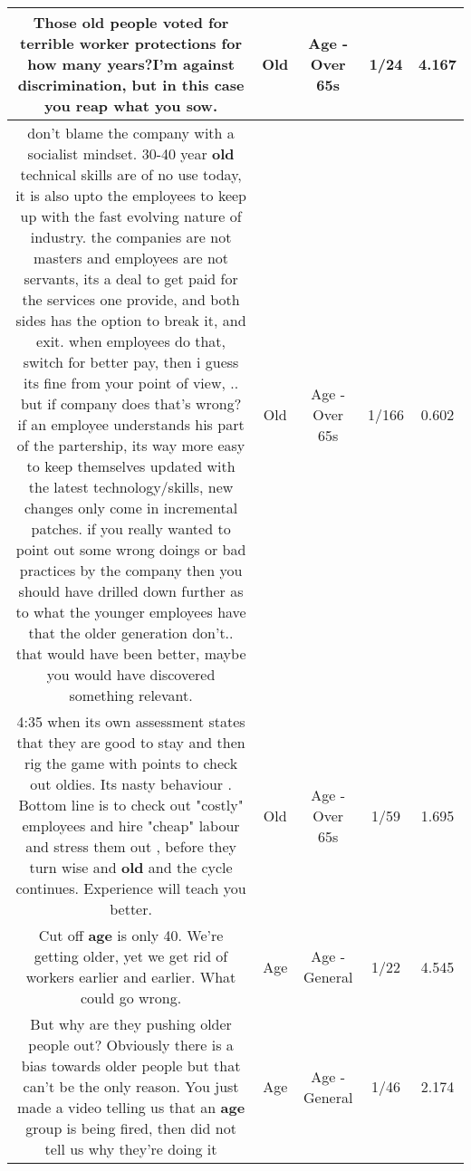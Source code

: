 \documentclass[11pt]{article}
\newlength\mylength
\begin{document}
\begin{center}
\begin{longtable}{|C{.65\mylength}|C{.30\mylength}|C{.12\mylength}|C{.12\mylength}|C{.12\mylength}|}
  \small Those \textbf{old} people voted for terrible worker protections for how many years?I'm against discrimination, but in this case you reap what you sow.\normalsize   & Old & Age - Over 65s & 1/24 & 4.167 \\  \hline
  \small don't blame the company with a socialist mindset. 30-40 year \textbf{old} technical skills are of no use today, it is also upto the employees to keep up with the fast evolving nature of industry. the companies are not masters and employees are not servants, its a deal to get paid for the services  one provide, and both sides has the option to break it, and exit. when employees do that, switch for better pay, then i guess its fine from your point of view, .. but if company does that's wrong? if an employee understands his part of the partership, its way more easy to keep themselves updated with the latest technology/skills, new changes only come in incremental patches. if you really wanted to point out some wrong doings or bad practices by the company then you should have drilled down further as to what the younger employees have that the older generation don't.. that would have been better, maybe you would have discovered something relevant.\normalsize   & Old & Age - Over 65s & 1/166 & 0.602 \\  \hline
  \small 4:35 when its own assessment states that they are good to stay and then rig the game with points to check out oldies. Its nasty behaviour . Bottom line is to check out "costly" employees and hire "cheap" labour and stress them out , before they turn wise and \textbf{old} and the cycle continues. Experience will teach you better.\normalsize   & Old & Age - Over 65s & 1/59 & 1.695 \\  \hline
  \small Cut off \textbf{age} is only 40. We're getting older, yet we get rid of workers earlier and earlier. What could go wrong.\normalsize   & Age & Age - General & 1/22 & 4.545 \\  \hline
  \small But why are they pushing older people out? Obviously there is a bias towards older people but that can't be the only reason. You just made a video telling us that an \textbf{age} group is being fired, then did not tell us why they're doing it\normalsize   & Age & Age - General & 1/46 & 2.174 \\  \hline

\end{longtable}
\end{center}
\end{document}
